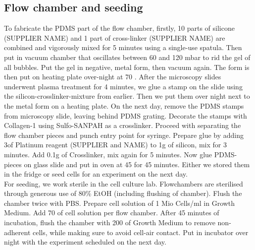 \subsection{Flow chamber and seeding}
\label{sec:FluidicModel}
To fabricate the PDMS part of the flow chamber, firstly, 10 parts of silicone (SUPPLIER NAME) and 1 part of cross-linker (SUPPLIER NAME) are combined and vigorously mixed for 5 minutes using a single-use spatula. Then put in vacuum chamber that oscillates between 60 and 120 mbar to rid the gel of all bubbles. Put the gel in negative, metal form, then vacuum again. The form is then put on heating plate over-night at 70 \degC{} . After the microscopy slides underwent plasma treatment for 4 minutes, we glue a stamp on the slide using the silicon-crosslinker-mixture from earlier. Then we put them over night next to the metal form on a heating plate. On the next day, remove the PDMS stamps from microscopy slide, leaving behind PDMS grating. Decorate the stamps with Collagen-1 using Sulfo-SANPAH as a crosslinker. Proceed with separating the flow chamber pieces and punch entry point for syringe. Prepare glue by adding 3\mul of Platinum reagent (SUPPLIER and NAME) to 1g of silicon, mix for 3 minutes. Add 0.1g of Crosslinker, mix again for 5 minutes. Now glue PDMS-pieces on glass slide and put in oven at 45 \degC{} for 45 minutes. Either we stored them in the fridge or seed cells for an experiment on the next day.\\
For seeding, we work sterile in the cell culture lab. Flowchambers are sterilised through generous use of 80\% EtOH (including flushing of chamber). Flush the chamber twice with PBS. Prepare cell solution of 1 Mio Cells/ml in Growth Medium. Add 70 \mul{} of cell solution per flow chamber. After 45 minutes of incubation, flush the chamber with 200\mul{} of Growth Medium to remove non-adherent cells, while making sure to avoid cell-air contact. Put in incubator over night with the experiment scheduled on the next day.

